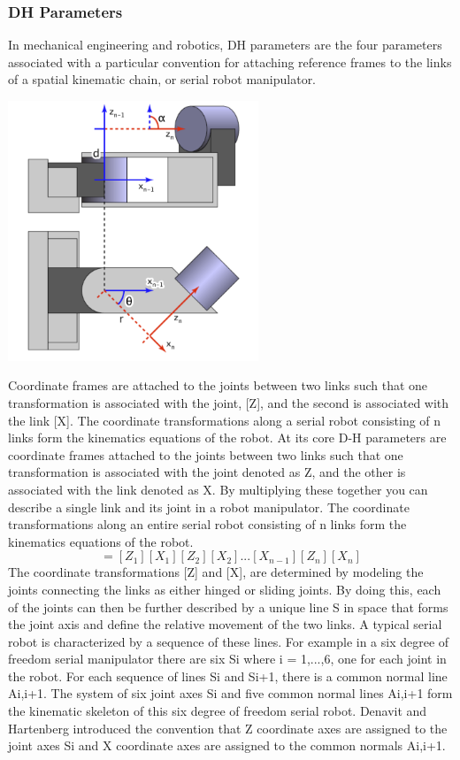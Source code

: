     \subsubsection{DH Parameters}
    In mechanical engineering and robotics, DH parameters are the four parameters associated with a particular convention for attaching reference frames to the links of a spatial kinematic chain, or serial robot manipulator.
    \begin{center}
    \includegraphics[width=75mm]{Dh.PNG}
    \end{center}
    Coordinate frames are attached to the joints between two links such that one transformation is associated with the joint, [Z], and the second is associated with the link [X]. The coordinate transformations along a serial robot consisting of n links form the kinematics equations of the robot. At its core D-H parameters are coordinate frames attached to the joints between two links such that one transformation is associated with the joint denoted as Z, and the other is associated with the link denoted as X. By multiplying these together you can describe a single link and its joint in a robot manipulator. The coordinate transformations along an entire serial robot consisting of n links form the kinematics equations of the robot.
    \begin{equation}
    [T] = [Z_1][X_1][Z_2][X_2]...[X_{n-1}][Z_n][X_n]

    \end{equation}
    The coordinate transformations [Z] and [X], are determined by modeling the joints connecting the links as either hinged or sliding joints. By doing this, each of the joints can then be further described by a unique line S in space that forms the joint axis and define the relative movement of the two links. A typical serial robot is characterized by a sequence of these lines. For example in a six degree of freedom serial manipulator there are six Si where i = 1,...,6, one for each joint in the robot. For each sequence of lines Si and Si+1, there is a common normal line Ai,i+1. The system of six joint axes Si and five common normal lines Ai,i+1 form the kinematic skeleton of this six degree of freedom serial robot. Denavit and Hartenberg introduced the convention that Z coordinate axes are assigned to the joint axes Si and X coordinate axes are assigned to the common normals Ai,i+1.

